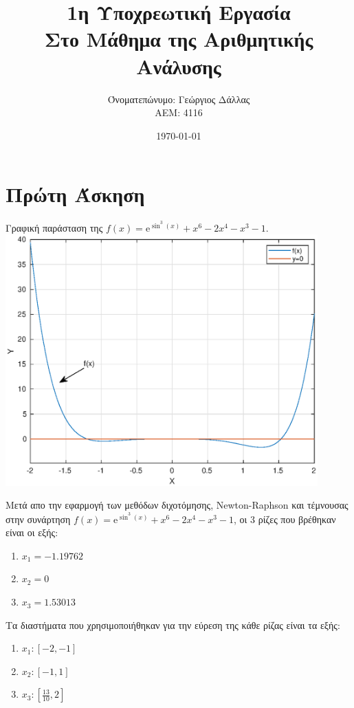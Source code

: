 \documentclass[a4paper,11pt]{article}
\title{1η Υποχρεωτική Εργασία\\
Στο Μάθημα της Αριθμητικής Ανάλυσης} %
\author{Όνοματεπώνυμο: Γεώργιος Δάλλας  \\  ΑΕΜ: 4116}       %
\date{\today}                                      %
\newcommand{\lt}{\latintext}
\newcommand{\gt}{\greektext}
\begin{document}

\maketitle

\section{Πρώτη Άσκηση}

\begin{center}
    Γραφική παράσταση της $f(x)=\mathrm{e}^{\sin^3\left(x\right)}+x^6-2x^4-x^3-1$.
    \includegraphics[width=12cm]{ask1.eps}\\
\end{center}
\newpage
    Μετά απο την εφαρμογή των μεθόδων διχοτόμησης, \lt Newton-Raphson \gt και τέμνουσας στην συνάρτηση $f(x)=\mathrm{e}^{\sin^3\left(x\right)}+x^6-2x^4-x^3-1$,  οι 3 ρίζες που βρέθηκαν είναι οι εξής:
    \begin{enumerate}
        \item $x_{1}=-1.19762$
        \item $x_{2}=0$
        \item $x_{3}=1.53013$
    \end{enumerate}
   Τα διαστήματα που χρησιμοποιήθηκαν για την εύρεση της κάθε ρίζας είναι τα εξής:
   \begin{enumerate}
        \item $x_{1}:[-2,-1]$
        \item $x_{2}:[-1,1]$
        \item $x_{3}:[\frac{13}{10},2]$
    \end{enumerate}
\end{document}
